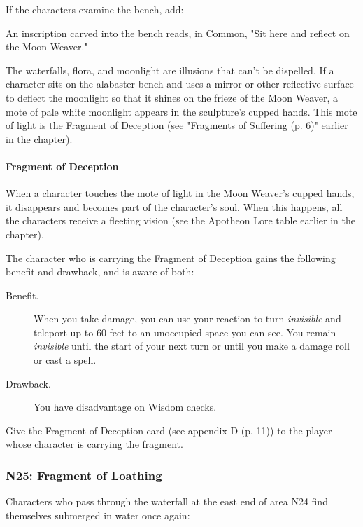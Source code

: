 \documentclass[letterpaper, 11pt, bg=full, twocolumn]{dndbook}
\begin{document}
If the characters examine the bench, add:

\begin{DndReadAloud}
An inscription carved into the bench reads, in Common, "Sit here and reflect on the Moon Weaver."
\end{DndReadAloud}

The waterfalls, flora, and moonlight are illusions that can't be dispelled. If a character sits on the alabaster bench and uses a mirror or other reflective surface to deflect the moonlight so that it shines on the frieze of the Moon Weaver, a mote of pale white moonlight appears in the sculpture's cupped hands. This mote of light is the Fragment of Deception (see "Fragments of Suffering (p. 6)" earlier in the chapter).

\paragraph{Fragment of Deception}

When a character touches the mote of light in the Moon Weaver's cupped hands, it disappears and becomes part of the character's soul. When this happens, all the characters receive a fleeting vision (see the Apotheon Lore table earlier in the chapter).

The character who is carrying the Fragment of Deception gains the following benefit and drawback, and is aware of both:

\begin{DndSidebar}{}
\begin{description}
\item[Benefit.] When you take damage, you can use your reaction to turn \textit{invisible} and teleport up to 60 feet to an unoccupied space you can see. You remain \textit{invisible} until the start of your next turn or until you make a damage roll or cast a spell.
\item[Drawback.] You have disadvantage on Wisdom checks.
\end{description}
\end{DndSidebar}

Give the Fragment of Deception card (see appendix D (p. 11)) to the player whose character is carrying the fragment.

\subsubsection{N25: Fragment of Loathing}

Characters who pass through the waterfall at the east end of area N24 find themselves submerged in water once again:
\end{document}
